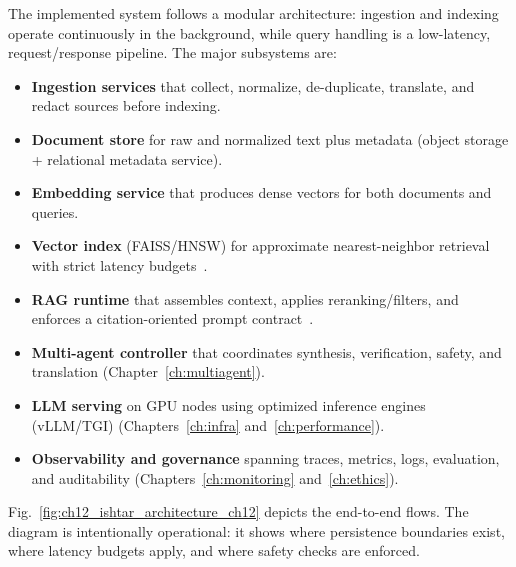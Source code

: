 The implemented system follows a modular architecture: ingestion and indexing operate continuously in the background, while query handling is a low-latency, request/response pipeline.
The major subsystems are:

\begin{itemize}
    \item \textbf{Ingestion services} that collect, normalize, de-duplicate, translate, and redact sources before indexing.
    \item \textbf{Document store} for raw and normalized text plus metadata (object storage + relational metadata service).
    \item \textbf{Embedding service} that produces dense vectors for both documents and queries.
    \item \textbf{Vector index} (FAISS/HNSW) for approximate nearest-neighbor retrieval with strict latency budgets~\cite{johnson2019billion,Malkov2018HNSW}.
    \item \textbf{RAG runtime} that assembles context, applies reranking/filters, and enforces a citation-oriented prompt contract~\cite{Lewis2020RAG}.
    \item \textbf{Multi-agent controller} that coordinates synthesis, verification, safety, and translation (Chapter~\ref{ch:multiagent}).
    \item \textbf{LLM serving} on GPU nodes using optimized inference engines (vLLM/TGI) (Chapters~\ref{ch:infra} and~\ref{ch:performance}).
    \item \textbf{Observability and governance} spanning traces, metrics, logs, evaluation, and auditability (Chapters~\ref{ch:monitoring} and~\ref{ch:ethics}).
\end{itemize}

Fig.~\ref{fig:ch12_ishtar_architecture_ch12} depicts the end-to-end flows. The diagram is intentionally operational: it shows where persistence boundaries exist, where latency budgets apply, and where safety checks are enforced.

